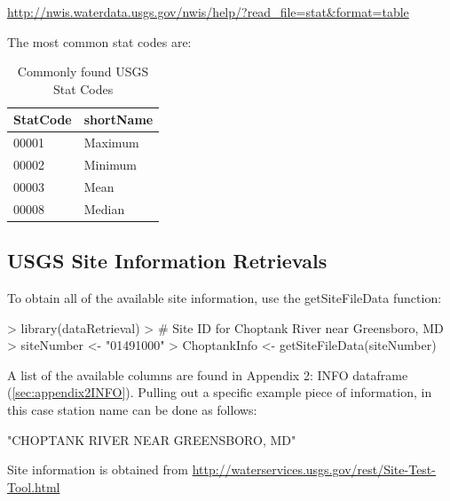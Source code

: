 \documentclass[a4paper,11pt]{article}
\begin{document}
\url{http://nwis.waterdata.usgs.gov/nwis/help/?read_file=stat&format=table}

The most common stat codes are:
\begin{table}[ht]
\begin{center}
\caption{Commonly found USGS Stat Codes}
\begin{tabular}{ll}
  \hline
StatCode & shortName \\ 
  \hline
00001 & Maximum \\ 
  00002 & Minimum \\ 
  00003 & Mean \\ 
  00008 & Median \\ 
   \hline
\end{tabular}
\end{center}
\end{table}

\subsection{USGS Site Information Retrievals}
\label{sec:usgsSite}
To obtain all of the available site information, use the getSiteFileData function:
\begin{Schunk}
\begin{Sinput}
> library(dataRetrieval)
> # Site ID for Choptank River near Greensboro, MD
> siteNumber <- "01491000" 
> ChoptankInfo <- getSiteFileData(siteNumber)
\end{Sinput}
\end{Schunk}

A list of the available columns are found in Appendix 2: INFO dataframe (\ref{sec:appendix2INFO}). Pulling out a specific example piece of information, in this case station name can be done as follows:

\begin{Schunk}
\begin{Soutput}
[1] "CHOPTANK RIVER NEAR GREENSBORO, MD"
\end{Soutput}
\end{Schunk}
Site information is obtained from \url{http://waterservices.usgs.gov/rest/Site-Test-Tool.html}

\end{document}
